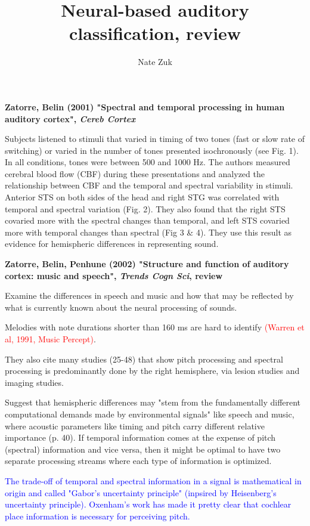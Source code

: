 \documentclass[11pt]{article}
\title{Neural-based auditory classification, review}
\author{Nate Zuk}
\begin{document}
\maketitle

\textbf{Zatorre, Belin (2001) "Spectral and temporal processing in human auditory cortex", \textit{Cereb Cortex}}

Subjects listened to stimuli that varied in timing of two tones (fast or slow rate of switching) or varied in the number of tones presented isochronously (see Fig. 1).  In all conditions, tones were between 500 and 1000 Hz.  The authors measured cerebral blood flow (CBF) during these presentations and analyzed the relationship between CBF and the temporal and spectral variability in stimuli.  Anterior STS on both sides of the head and right STG was correlated with temporal and spectral variation (Fig. 2).  They also found that the right STS covaried more with the spectral changes than temporal, and left STS covaried more with temporal changes than spectral (Fig 3 \& 4).  They use this result as evidence for hemispheric differences in representing sound.

\textbf{Zatorre, Belin, Penhune (2002) "Structure and function of auditory cortex: music and speech", \textit{Trends Cogn Sci}, review}

Examine the differences in speech and music and how that may be reflected by what is currently known about the neural processing of sounds.

Melodies with note durations shorter than 160 ms are hard to identify \textcolor{red}{(Warren et al, 1991, Music Percept)}.

They also cite many studies (25-48) that show pitch processing and spectral processing is predominantly done by the right hemisphere, via lesion studies and imaging studies.

Suggest that hemispheric differences may "stem from the fundamentally different computational demands made by environmental signals" like speech and music, where acoustic parameters like timing and pitch carry different relative importance (p. 40).  If temporal information comes at the expense of pitch (spectral) information and vice versa, then it might be optimal to have two separate processing streams where each type of information is optimized.

\textcolor{blue}{The trade-off of temporal and spectral information in a signal is mathematical in origin and called "Gabor's uncertainty principle" (inpsired by Heisenberg's uncertainty principle).  Oxenham's work has made it pretty clear that cochlear place information is necessary for perceiving pitch.}
\end{document}
